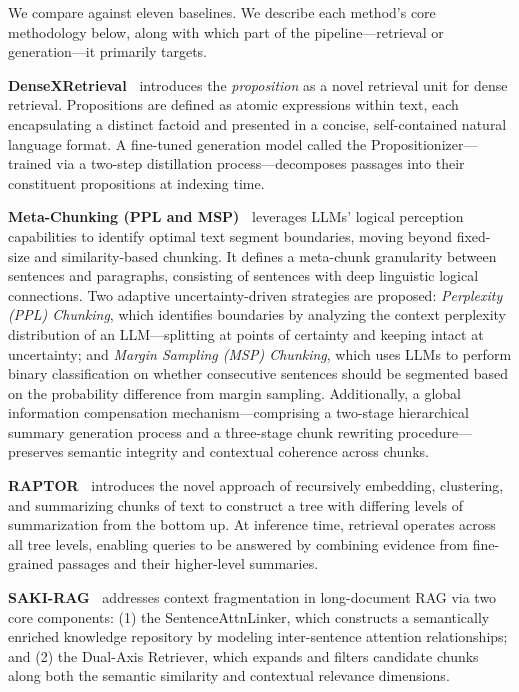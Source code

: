 \documentclass{llmxive}
\begin{document}
We compare against eleven baselines. We describe each method's core methodology below, along with which part of the pipeline—retrieval or generation—it primarily targets.

\noindent
\textbf{DenseXRetrieval~\cite{chen-etal-2024-dense}} introduces the \emph{proposition} as a novel retrieval unit for dense retrieval. Propositions are defined as atomic expressions within text, each encapsulating a distinct factoid and presented in a concise, self-contained natural language format.  A fine-tuned generation model called the Propositionizer—trained via a two-step distillation process—decomposes passages into their constituent propositions at indexing time.

\noindent
\textbf{Meta-Chunking (PPL and MSP)~\cite{zhao2024meta}} leverages LLMs' logical perception capabilities to identify optimal text segment boundaries, moving beyond fixed-size and similarity-based chunking. It defines a meta-chunk granularity between sentences and paragraphs, consisting of sentences with deep linguistic logical connections.  Two adaptive uncertainty-driven strategies are proposed: \emph{Perplexity (PPL) Chunking}, which identifies boundaries by analyzing the context perplexity distribution of an LLM—splitting at points of certainty and keeping intact at uncertainty; and \emph{Margin Sampling (MSP) Chunking}, which uses LLMs to perform binary classification on whether consecutive sentences should be segmented based on the probability difference from margin sampling. Additionally, a global information compensation mechanism—comprising a two-stage hierarchical summary generation process and a three-stage chunk rewriting procedure—preserves semantic integrity and contextual coherence across chunks.

\noindent
\textbf{RAPTOR~\cite{sarthi2024raptor}} introduces the novel approach of recursively embedding, clustering, and summarizing chunks of text to construct a tree with differing levels of summarization from the bottom up.  At inference time, retrieval operates across all tree levels, enabling queries to be answered by combining evidence from fine-grained passages and their higher-level summaries.

\noindent
\textbf{SAKI-RAG~\cite{tao-etal-2025-saki}} addresses context fragmentation in long-document RAG via two core components: (1) the SentenceAttnLinker, which constructs a semantically enriched knowledge repository by modeling inter-sentence attention relationships; and (2) the Dual-Axis Retriever, which expands and filters candidate chunks along both the semantic similarity and contextual relevance dimensions.
\end{document}
